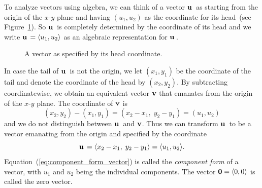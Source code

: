 To analyze vectors using algebra, we can think of a vector $\operatorname*{\mathbf{u}}{}$
as starting from the origin of the $x$-$y$ plane and having
$(u_1, u_2)$ as the coordinate for its head~(see
Figure~\ref{fig:specify_vector_head_coordinate}). So $\operatorname*{\mathbf{u}}{}$ is
completely determined by the coordinate of its head and we write
$\operatorname*{\mathbf{u}}{} = \langle u_1, u_2 \rangle$ as an algebraic representation
for $\operatorname*{\mathbf{u}}{}$.

\begin{figure}[!htpb]
\centering
{}
\caption{A vector as specified by its head coordinate.}
\label{fig:specify_vector_head_coordinate}
\end{figure}

In case the tail of $\operatorname*{\mathbf{u}}{}$ is not the origin, we let $(x_1, y_1)$
be the coordinate of the tail and denote the coordinate of the head by
$(x_2, y_2)$. By subtracting coordinatewise, we obtain an equivalent
vector $\operatorname*{\mathbf{v}}$ that emanates from the origin of the $x$-$y$
plane. The coordinate of $\operatorname*{\mathbf{v}}$ is
\[
(x_2, y_2) - (x_1, y_1)
=
(x_2 - x_1,\; y_2 - y_1)
=
(u_1, u_2)
\]
and we do not distinguish between $\operatorname*{\mathbf{u}}{}$ and $\operatorname*{\mathbf{v}}$. Thus we
can transform $\operatorname*{\mathbf{u}}{}$ to be a vector emanating from the origin and
specified by the coordinate
%
\begin{equation}
\label{eq:component_form_vector}
\operatorname*{\mathbf{u}}{}
=
\langle x_2 - x_1,\; y_2 - y_1 \rangle
=
\langle u_1, u_2 \rangle.
\end{equation}
%
Equation~(\ref{eq:component_form_vector}) is called the
\emph{component form} of a vector, with $u_1$
and $u_2$ being the individual components. The vector
$\operatorname*{\textbf{0}} = \langle 0, 0 \rangle$ is called the zero
vector.

